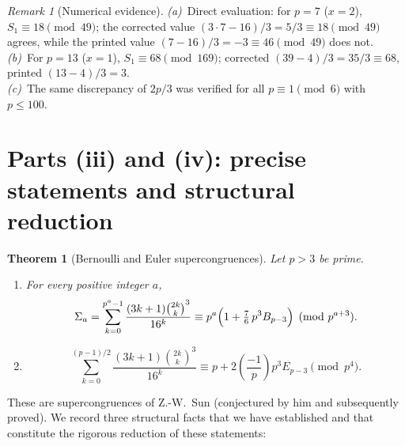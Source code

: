 \documentclass[12pt]{article}
\newtheorem{theorem}{Theorem}
\theoremstyle{remark}
\newtheorem{remark}{Remark}
\newcommand{\leg}[2]{\left(\frac{#1}{#2}\right)}
\newcommand{\bin}[2]{\binom{#1}{#2}}
\begin{document}
\begin{remark}[Numerical evidence]
\emph{(a)}\ Direct evaluation: for $p=7$ ($x=2$), $S_1\equiv18\pmod{49}$; the
corrected value $(3\cdot7-16)/3=5/3\equiv18\pmod{49}$ agrees, while the printed
value $(7-16)/3=-3\equiv46\pmod{49}$ does not.\\
\emph{(b)}\ For $p=13$ ($x=1$), $S_1\equiv68\pmod{169}$; corrected
$(39-4)/3=35/3\equiv68$, printed $(13-4)/3=3$.\\
\emph{(c)}\ The same discrepancy of $2p/3$ was verified for all
$p\equiv1\pmod6$ with $p\le100$.
\end{remark}

\section{Parts (iii) and (iv): precise statements and structural reduction}

\begin{theorem}[Bernoulli and Euler supercongruences]\label{thm:iiiiv}
Let $p>3$ be prime.
\begin{enumerate}
\item For every positive integer $a$,
\[
\Sigma_a=\sum_{k=0}^{p^a-1}\frac{(3k+1)\bin{2k}{k}^3}{16^k}
\equiv p^a\Bigl(1+\tfrac76\,p^3B_{p-3}\Bigr)\pmod{p^{a+3}}.
\]
\item
\[
\sum_{k=0}^{(p-1)/2}\frac{(3k+1)\bin{2k}{k}^3}{16^k}
\equiv p+2\leg{-1}{p}p^3E_{p-3}\pmod{p^4}.
\]
\end{enumerate}
\end{theorem}

These are supercongruences of Z.-W.\ Sun (conjectured by him and subsequently
proved).  We record three structural facts that we have established and that
constitute the rigorous reduction of these statements:
\end{document}

